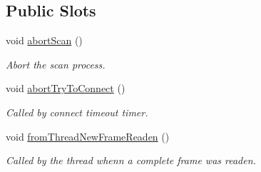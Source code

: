 \subsection*{Public Slots}
\begin{DoxyCompactItemize}
\item 
\hypertarget{classmdt_modbus_tcp_port_manager_ab6cc6b2a57c1c126be0a9c3142a6f0e5}{
void \hyperlink{classmdt_modbus_tcp_port_manager_ab6cc6b2a57c1c126be0a9c3142a6f0e5}{abortScan} ()}
\label{classmdt_modbus_tcp_port_manager_ab6cc6b2a57c1c126be0a9c3142a6f0e5}

\begin{DoxyCompactList}\small\item\em Abort the scan process. \end{DoxyCompactList}\item 
\hypertarget{classmdt_modbus_tcp_port_manager_a4d16b312f74974d4147d631b425771e4}{
void \hyperlink{classmdt_modbus_tcp_port_manager_a4d16b312f74974d4147d631b425771e4}{abortTryToConnect} ()}
\label{classmdt_modbus_tcp_port_manager_a4d16b312f74974d4147d631b425771e4}

\begin{DoxyCompactList}\small\item\em Called by connect timeout timer. \end{DoxyCompactList}\item 
void \hyperlink{classmdt_modbus_tcp_port_manager_ad941ea607f00db54aa6deb2866a539e9}{fromThreadNewFrameReaden} ()
\begin{DoxyCompactList}\small\item\em Called by the thread whenn a complete frame was readen. \end{DoxyCompactList}\end{DoxyCompactItemize}
